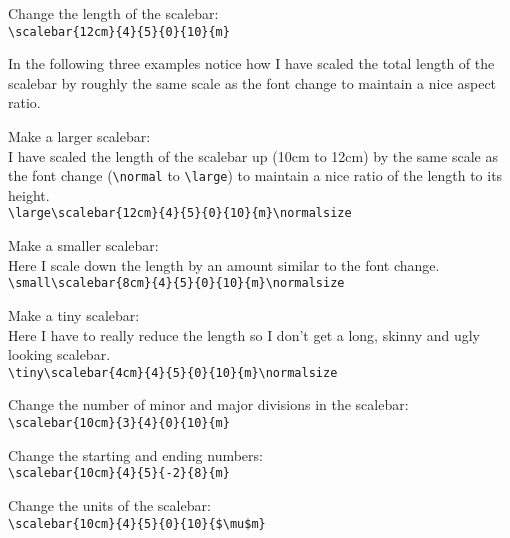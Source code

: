 \documentclass[a4paper,12pt]{article}
\begin{document}
Change the length of the scalebar:\\
\verb+\scalebar{12cm}{4}{5}{0}{10}{m}+\\

\newpage

In the following three examples notice how I have scaled the total 
length of the scalebar by roughly the same scale as the font change 
to maintain a nice aspect ratio.

Make a larger scalebar:\\
I have scaled the length of the scalebar up (10cm to 12cm) by the same 
scale as the font change (\verb+\normal+ to \verb+\large+) to maintain 
a nice ratio of the length to its height.\\
\verb+\large\scalebar{12cm}{4}{5}{0}{10}{m}\normalsize+\\
      \large{}\normalsize
\vspace{\baselineskip}


Make a smaller scalebar:\\
Here I scale down the length by an amount similar to the font change.\\
\verb+\small\scalebar{8cm}{4}{5}{0}{10}{m}\normalsize+\\
      \small{}\normalsize
\vspace{\baselineskip}


Make a tiny scalebar:\\
Here I have to really reduce the length so I don't get a long, skinny and 
ugly looking scalebar.\\
\verb+\tiny\scalebar{4cm}{4}{5}{0}{10}{m}\normalsize+\\
      \tiny{}\normalsize
\vspace{\baselineskip}


Change the number of minor and major divisions in the scalebar:\\
\verb+\scalebar{10cm}{3}{4}{0}{10}{m}+\\
\vspace{\baselineskip}


Change the starting and ending numbers:\\
\verb+\scalebar{10cm}{4}{5}{-2}{8}{m}+\\
\vspace{\baselineskip}

Change the units of the scalebar:\\
\verb+\scalebar{10cm}{4}{5}{0}{10}{$\mu$m}+\\
\vspace{\baselineskip}
\end{document}
